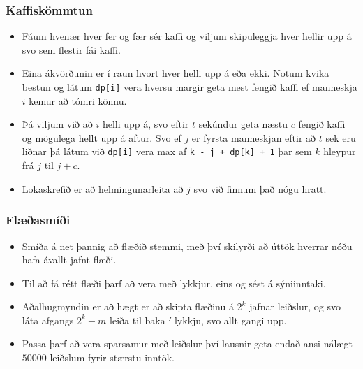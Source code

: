 \documentclass{beamer}
\begin{document}
\begin{frame}
\frametitle{Kaffiskömmtun}

\begin{itemize}

\item Fáum hvenær hver fer og fær sér kaffi og viljum skipuleggja hver hellir upp á svo sem flestir fái kaffi.

\vspace*{0.25cm}

\item Eina ákvörðunin er í raun hvort hver helli upp á eða ekki. Notum kvika bestun og látum \texttt{dp[i]} vera hversu margir geta mest fengið kaffi ef manneskja $i$ kemur að tómri könnu.

\vspace*{0.25cm}

\item Þá viljum við að $i$ helli upp á, svo eftir $t$ sekúndur geta næstu $c$ fengið kaffi og mögulega hellt upp á aftur. Svo ef $j$ er fyrsta manneskjan eftir að $t$ sek eru liðnar þá látum við \texttt{dp[i]} vera max af \texttt{k - j + dp[k] + 1} þar sem $k$ hleypur frá $j$ til $j + c$.

\vspace*{0.25cm}

\item Lokaskrefið er að helmingunarleita að $j$ svo við finnum það nógu hratt.

\end{itemize}

\end{frame}

\begin{frame}
\frametitle{Flæðasmíði}

\begin{itemize}

\item Smíða á net þannig að flæðið stemmi, með því skilyrði að úttök hverrar nóðu hafa ávallt jafnt flæði.

\vspace*{0.25cm}

\item Til að fá rétt flæði þarf að vera með lykkjur, eins og sést á sýniinntaki.

\vspace*{0.25cm}

\item Aðalhugmyndin er að hægt er að skipta flæðinu á $2^k$ jafnar leiðslur, og svo láta afgangs $2^k - m$ leiða til baka í lykkju, svo allt gangi upp.

\vspace*{0.25cm}

\item Passa þarf að vera sparsamur með leiðslur því lausnir geta endað ansi nálægt $50000$ leiðslum fyrir stærstu inntök.

\end{itemize}

\end{frame}
\end{document}
